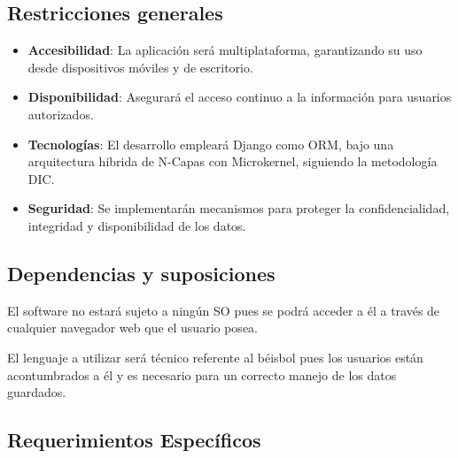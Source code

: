 \documentclass{report}
\begin{document}
        \subsection*{Restricciones generales}
        \begin{itemize}
            \item \textbf{Accesibilidad}: La aplicación será multiplataforma, garantizando su uso desde dispositivos 
            móviles y de escritorio.
            \item \textbf{Disponibilidad}: Asegurará el acceso continuo a la información para usuarios autorizados.
            \item \textbf{Tecnologías}: El desarrollo empleará Django como ORM, bajo una arquitectura hibrida de 
            N-Capas con Microkernel, siguiendo la metodología DIC.
            \item \textbf{Seguridad}: Se implementarán mecanismos para proteger la confidencialidad, integridad y 
            disponibilidad de los datos.
        \end{itemize}

        \subsection*{Dependencias y suposiciones}
        El software no estará sujeto a ningún SO pues se podrá acceder a él a través de cualquier navegador web que 
        el usuario posea.
        
        El lenguaje a utilizar será técnico referente al béisbol pues los usuarios están acontumbrados a él y es 
        necesario para un correcto manejo de los datos guardados.

    \newpage
    
    \begin{center}
        \section*{Requerimientos Específicos}
    \end{center}

    \vspace{0.5cm}
\end{document}
